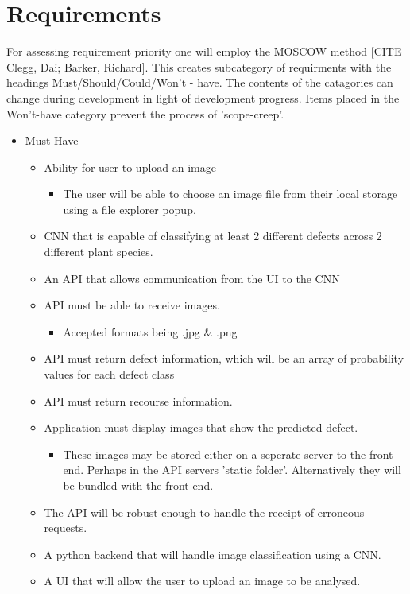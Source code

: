 \section{Requirements}
For assessing requirement priority one will employ the MOSCOW method [CITE Clegg, Dai; Barker, Richard]. This creates subcategory of requirments with the headings Must/Should/Could/Won't - have. The contents of the catagories can change during development in light of development progress. Items placed in the Won't-have category prevent the process of 'scope-creep'.
\begin{itemize}
  \item Must Have
  \begin{itemize}
    \item Ability for user to upload an image
      \begin{itemize}
        \item The user will be able to choose an image file from their local storage using a file explorer popup.
      \end{itemize}
    \item CNN that is capable of classifying at least 2 different defects
      across 2 different plant species.
    \item An API that allows communication from the UI to the CNN
    \item API must be able to receive images.
      \begin{itemize}
        \item Accepted formats being .jpg \& .png
      \end{itemize}
    \item API must return defect information, which will be an array of probability values for each defect class
    \item API must return recourse information.
    \item Application must display images that show the predicted defect.
      \begin{itemize}
        \item These images may be stored either on a seperate server to the front-end. Perhaps in the API servers 'static folder'. Alternatively they will be bundled with the front end.
      \end{itemize}
  	\item The API will be robust enough to handle the receipt of erroneous requests.
  	\item A python backend that will handle image classification using a CNN.
  	\item A UI that will allow the user to upload an image to be analysed.

\end{itemize}
\end{itemize}
